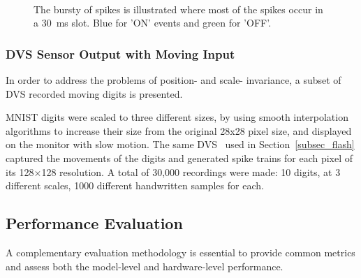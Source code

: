 \documentclass{frontiersENG} %
\begin{document}
\begin{figure}[b!]
	\centering
	\\
	
	\caption{The bursty of spikes is illustrated where most of the spikes occur in a 30~ms slot. Blue for 'ON' events and green for 'OFF'.}
	\label{fig:flash}
\end{figure}

\subsubsection{DVS Sensor Output with Moving Input}
In order to address the problems of position- and scale- invariance, a subset of DVS recorded moving digits is presented.

MNIST digits were scaled to three different sizes, by using smooth interpolation algorithms to increase their size from the original 28x28 pixel size, and displayed on the monitor with slow motion. 
The same DVS~\citep{serrano2013128} used in Section~\ref{subsec_flash} captured the movements of the digits and generated spike trains for each pixel of its 128$\times$128 resolution.
A total of 30,000 recordings were made: 10 digits, at 3 different scales, 1000 different handwritten samples for each.

\subsection{Performance Evaluation}
\label{sec:eval}
A complementary evaluation methodology is essential to provide common metrics and assess both the model-level and hardware-level performance.
\end{document}
